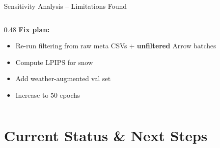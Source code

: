 \documentclass[aspectratio=169, 10pt]{beamer}
\begin{document}
\begin{frame}{Sensitivity Analysis -- Limitations Found}
\begin{columns}[T]
\begin{column}{0.48\textwidth}
\vspace{0.3em}
\textbf{\textcolor{okgreen}{Fix plan:}}
\begin{itemize}
    \item Re-run filtering from raw meta CSVs + \textbf{unfiltered} Arrow batches
    \item Compute LPIPS for snow
    \item Add weather-augmented val set
    \item Increase to 50 epochs
\end{itemize}
\end{column}
\end{columns}
\end{frame}

\section{Current Status \& Next Steps}
\end{document}
